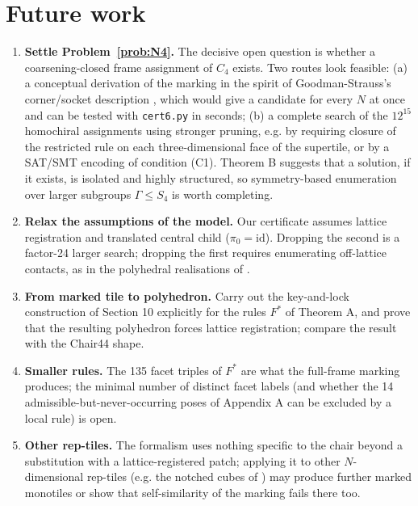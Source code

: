 \documentclass[11pt,a4paper]{article}
\theoremstyle{plain}
\theoremstyle{definition}
\begin{document}
\section{Future work}

\begin{enumerate}
\item \textbf{Settle Problem~\ref{prob:N4}.} The decisive open question is whether a coarsening-closed frame assignment of $C_4$ exists. Two routes look feasible: (a) a conceptual derivation of the marking in the spirit of Goodman-Strauss's corner/socket description \cite{gs2026}, which would give a candidate for every $N$ at once and can be tested with \texttt{cert6.py} in seconds; (b) a complete search of the $12^15$ homochiral assignments using stronger pruning, e.g. by requiring closure of the restricted rule on each three-dimensional face of the supertile, or by a SAT/SMT encoding of condition (C1). Theorem B suggests that a solution, if it exists, is isolated and highly structured, so symmetry-based enumeration over larger subgroups $\Gamma \le  S_4$ is worth completing.

\item \textbf{Relax the assumptions of the model.} Our certificate assumes lattice registration and translated central child ($\pi_0 = \mathrm{\mathrm{id}}$). Dropping the second is a factor-24 larger search; dropping the first requires enumerating off-lattice contacts, as in the polyhedral realisations of \cite{tsiokos,flicker}.

\item \textbf{From marked tile to polyhedron.} Carry out the key-and-lock construction of Section 10 explicitly for the rules $F^*$ of Theorem A, and prove that the resulting polyhedron forces lattice registration; compare the result with the Chair44 shape.

\item \textbf{Smaller rules.} The 135 facet triples of $F^*$ are what the full-frame marking produces; the minimal number of distinct facet labels (and whether the 14 admissible-but-never-occurring poses of Appendix A can be excluded by a local rule) is open.

\item \textbf{Other rep-tiles.} The formalism uses nothing specific to the chair beyond a substitution with a lattice-registered patch; applying it to other $N$-dimensional rep-tiles (e.g. the notched cubes of \cite{gs99}) may produce further marked monotiles or show that self-similarity of the marking fails there too.
\end{enumerate}
\end{document}
